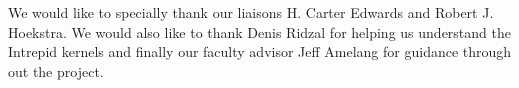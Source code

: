 \documentclass{hmcclinic}
\begin{document}
\tableofcontents
\listoffigures
\listoftables




\begin{acknowledgments}
We would like to specially thank our liaisons H. Carter Edwards and Robert J. Hoekstra. We would also like to thank Denis Ridzal for helping us understand the Intrepid kernels and finally our faculty advisor Jeff Amelang for guidance through out the project.
\end{acknowledgments}





\mainmatter





\end{document}
